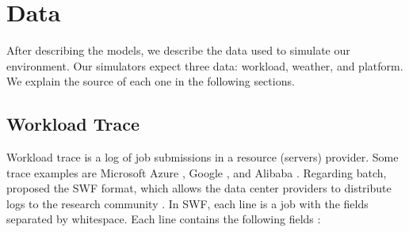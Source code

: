 \section{Data}
After describing the models, we describe the data used to simulate our environment. Our simulators expect three data: workload, weather, and platform. We explain the source of each one in the following sections. 

\subsection{Workload Trace}
\label{sec:workload_trace}

Workload trace is a log of job submissions in a resource (servers) provider. Some trace examples are Microsoft Azure \cite{cortez2017resource}, Google \cite{reiss2011google}, and Alibaba \cite{wang2022characterizing}. Regarding batch, \citeauthor{feitelson2014experience} proposed the SWF format, which allows the data center providers to distribute logs to the research community \cite{feitelson2014experience}. In SWF, each line is a job with the fields separated by whitespace. Each line contains the following fields \cite{feitelson2014experience}:
